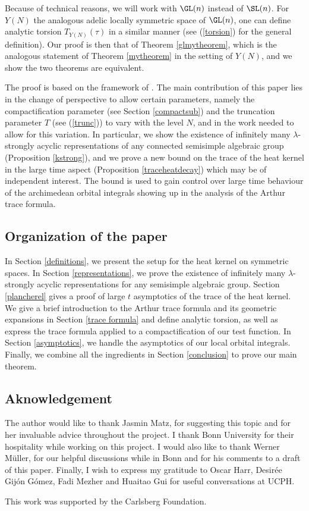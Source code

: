 Because of technical reasons, we will work with $\GL(n)$ instead of $\SL(n)$. For $Y(N)$ the analogous adelic locally symmetric space of $\GL(n)$, one can define analytic torsion $T_{Y(N)}(\tau)$ in a similar manner (see (\ref{torsion}) for the general definition). Our proof is then that of Theorem \ref{glmytheorem}, which is the analogous statement of Theorem \ref{mytheorem} in the setting of $Y(N)$, and we show the two theorems are equivalent.

The proof is based on the framework of \cite{MzM2}. The main contribution of this paper lies in the change of perspective to allow certain parameters, namely the compactification parameter (see Section \ref{compactsub}) and the truncation parameter $T$ (see (\ref{trunc})) to vary with the level $N$, and in the work needed to allow for this variation. In particular, we show the existence of infinitely many $\lambda$-strongly acyclic representations of any connected semisimple algebraic group (Proposition \ref{kstrong}), and we prove a new bound on the trace of the heat kernel in the large time aspect (Proposition \ref{traceheatdecay}) which may be of independent interest. The bound is used to gain control over large time behaviour of the archimedean orbital integrals showing up in the analysis of the Arthur trace formula.

\subsection{Organization of the paper} 

In Section \ref{definitions}, we present the setup for the heat kernel on symmetric spaces. In Section \ref{representations}, we prove the existence of infinitely many $\lambda$-strongly acyclic representations for any semisimple algebraic group. Section \ref{plancherel} gives a proof of large $t$ asymptotics of the trace of the heat kernel. We give a brief introduction to the Arthur trace formula and its geometric expansions in Section \ref{trace formula} and define analytic torsion, as well as express the trace formula applied to a compactification of our test function. In Section \ref{asymptotics}, we handle the asymptotics of our local orbital integrals. Finally, we combine all the ingredients in Section \ref{conclusion} to prove our main theorem.

\subsection{Aknowledgement}

The author would like to thank Jasmin Matz, for suggesting this topic and for her invaluable advice throughout the project. I thank Bonn University for their hospitality while working on this project. I would also like to thank Werner Müller, for our helpful discussions while in Bonn and for his comments to a draft of this paper. Finally, I wish to express my gratitude to Oscar Harr, Desirée Gijón Gómez, Fadi Mezher and Huaitao Gui for useful conversations at UCPH. 

This work was supported by the Carlsberg Foundation.